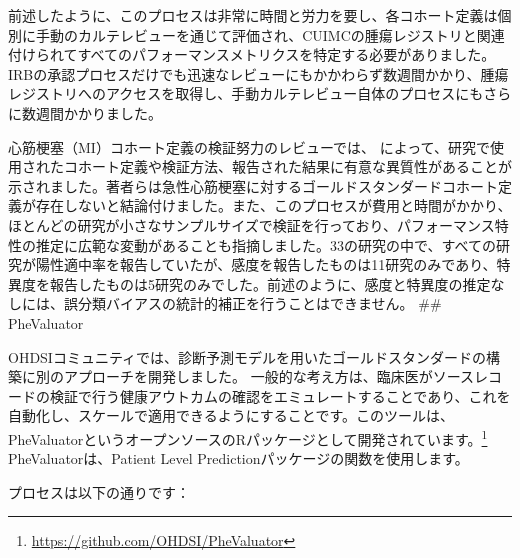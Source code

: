 \documentclass[
  11pt]{book}
\theoremstyle{definition}
\theoremstyle{definition}
\theoremstyle{definition}
\theoremstyle{definition}
\theoremstyle{remark}
\begin{document}
前述したように、このプロセスは非常に時間と労力を要し、各コホート定義は個別に手動のカルテレビューを通じて評価され、CUIMCの腫瘍レジストリと関連付けられてすべてのパフォーマンスメトリクスを特定する必要がありました。IRBの承認プロセスだけでも迅速なレビューにもかかわらず数週間かかり、腫瘍レジストリへのアクセスを取得し、手動カルテレビュー自体のプロセスにもさらに数週間かかりました。

心筋梗塞（MI）コホート定義の検証努力のレビューでは、\citet{Rubbo2015phenotypes} によって、研究で使用されたコホート定義や検証方法、報告された結果に有意な異質性があることが示されました。著者らは急性心筋梗塞に対するゴールドスタンダードコホート定義が存在しないと結論付けました。また、このプロセスが費用と時間がかかり、ほとんどの研究が小さなサンプルサイズで検証を行っており、パフォーマンス特性の推定に広範な変動があることも指摘しました。33の研究の中で、すべての研究が陽性適中率を報告していたが、感度を報告したものは11研究のみであり、特異度を報告したものは5研究のみでした。前述のように、感度と特異度の推定なしには、誤分類バイアスの統計的補正を行うことはできません。
\#\# PheValuator


OHDSIコミュニティでは、診断予測モデルを用いたゴールドスタンダードの構築に別のアプローチを開発しました。\citep{Swerdel2019phevaluator} 一般的な考え方は、臨床医がソースレコードの検証で行う健康アウトカムの確認をエミュレートすることであり、これを自動化し、スケールで適用できるようにすることです。このツールは、PheValuatorというオープンソースのRパッケージとして開発されています。\footnote{\url{https://github.com/OHDSI/PheValuator}} PheValuatorは、Patient Level Predictionパッケージの関数を使用します。

プロセスは以下の通りです：
\end{document}
